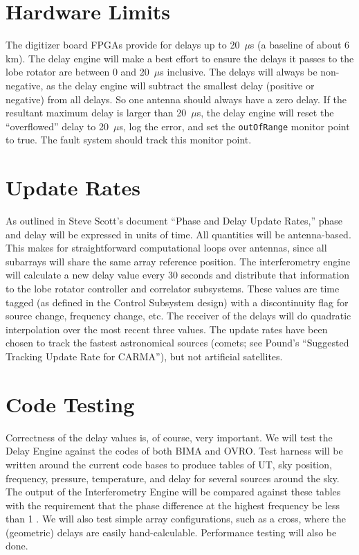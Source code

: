 \documentclass[preprint]{aastex}
\def\degree{\ifmmode{^\circ} \else{$^\circ$}\fi}
\begin{document}
\section{Hardware Limits}

The digitizer board FPGAs provide for delays up to 20~$\mu$s
(a baseline of about 6 km).  The delay engine will make
a best effort to ensure the delays it passes to the lobe rotator
are between 0 and 20~$\mu$s inclusive.  The delays will
always be non-negative, as the delay engine will subtract the
smallest delay (positive or negative) from all delays. So one
antenna should always have a zero delay.  If the resultant
maximum delay is larger than 20~$\mu$s, the delay engine will
reset the ``overflowed'' delay to 20~$\mu$s, log the error, and
set the {\tt outOfRange} monitor point to true.  The fault system should
track this monitor point.


\section{Update Rates}
As outlined in Steve Scott's document ``Phase and Delay Update
Rates,'' phase and delay will be expressed in units of time.
All quantities will be antenna-based. This makes for straightforward
computational loops over antennas, since all subarrays will
share the same array reference position.  The interferometry
engine will calculate a new delay value every 30 seconds and
distribute that information to the lobe rotator controller and
correlator subsystems.  These values are time tagged (as defined
in the Control Subsystem design) with a discontinuity flag for
source change, frequency change, etc. The receiver of the delays
will do quadratic interpolation over the most recent three values.
The update rates have been chosen to track the fastest astronomical
sources (comets; see Pound's ``Suggested Tracking Update Rate for
CARMA''), but not artificial satellites.

\section{Code Testing}
Correctness of the delay values is, of course, very important. We will
test the Delay Engine against the codes of both BIMA and OVRO.
Test harness will be written around the current code bases to produce
tables of UT, sky position, frequency, pressure, temperature, and delay
for several sources around the sky.  The output of the Interferometry
Engine will be compared against these tables with the requirement that
the phase difference at the highest frequency be less than 1\degree.
We will also test simple array configurations, such as a cross, where
the (geometric) delays are easily hand-calculable.  Performance
testing will also be done.
\end{document}
